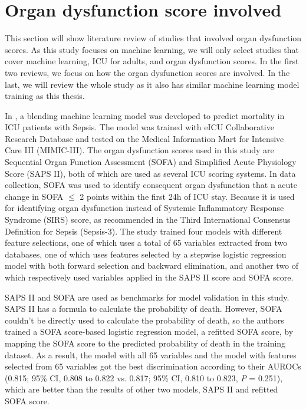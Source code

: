 \documentclass[12pt,a4paper,english
]{tunithesis}
\begin{document}
\section{Organ dysfunction score involved}
This section will show literature review of studies that involved organ dysfunction scores. As this study focuses on machine learning, we will only select studies that cover machine learning, ICU for adults, and organ dysfunction scores. In the first two reviews, we focus on how the organ dysfunction scores are involved. In the last, we will review the whole study as it also has similar machine learning model training as this thesis.

In \textcite{zeng2021}, a blending machine learning model was developed to predict mortality in ICU patients with Sepsis. The model was trained with eICU Collaborative Research Database and tested on the Medical Information Mart for Intensive Care III (MIMIC-III). The organ dysfunction scores used in this study are Sequential Organ Function Assessment (SOFA) and Simplified Acute Physiology Score (SAPS II), both of which are used as several ICU scoring systems. In data collection, SOFA was used to identify consequent organ dysfunction that n acute change in SOFA $\leq$ 2 points within the first 24h of ICU stay. Because it is used for identifying organ dysfunction instead of Systemic Inflammatory Response Syndrome (SIRS) score, as recommended in the Third International Consensus Definition for Sepsis (Sepsis-3). The study trained four models with different feature selections, one of which uses a total of 65 variables extracted from two databases, one of which uses features selected by a stepwise logistic regression model with both forward selection and backward elimination, and another two of which respectively used variables applied in the SAPS II score and SOFA score. 

SAPS II and SOFA are used as benchmarks for model validation in this study. SAPS II has a formula to calculate the probability of death. However, SOFA couldn't be directly used to calculate the probability of death, so the authors trained a SOFA score-based logistic regression model, a refitted SOFA score, by mapping the SOFA score to the predicted probability of death in the training dataset. As a result, the model with all 65 variables and the model with features selected from 65 variables got the best discrimination according to their AUROCs (0.815; 95\% CI, 0.808 to 0.822 vs. 0.817; 95\% CI, 0.810 to 0.823, \textit{P} = 0.251), which are better than the results of other two models, SAPS II and refitted SOFA score.
\end{document}
